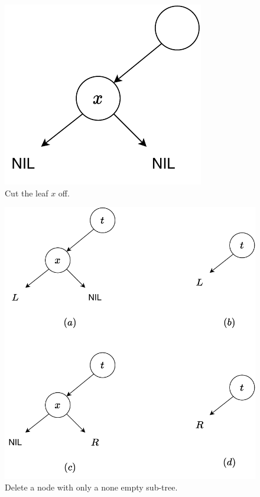 \documentclass[b5paper]{article}
\begin{document}
\begin{figure}[htbp]
  \centering
  \includegraphics[scale=0.6]{img/del-leaf}
  \caption{Cut the leaf $x$ off.} \label{fig:del-leaf}
\end{figure}

\begin{figure}[htbp]
  \centering
  \includegraphics[scale=0.6]{img/del-singleton}
  \caption{Delete a node with only a none empty sub-tree.}
  \label{fig:del-1child}
\end{figure}
\end{document}
